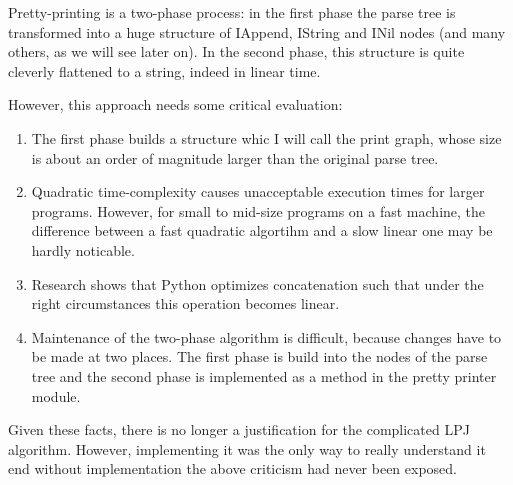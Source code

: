 \documentclass[11pt, a4paper]{article}
\begin{document}
Pretty-printing is a two-phase process: in the first phase the parse tree is transformed into a huge structure of IAppend, IString and INil nodes (and many others, as we will see later on).
In the second phase, this structure is quite cleverly flattened to a string, indeed in linear time.

However, this approach needs some critical evaluation:

\begin{enumerate}
\item The first phase builds a structure whic I will call the print graph, whose size is about an order of magnitude larger than the original parse tree.

\item Quadratic time-complexity causes unacceptable execution times for larger programs.
However, for small to mid-size programs on a fast machine, the difference between a fast quadratic algortihm and a slow linear one may be hardly noticable.

\item Research shows that Python optimizes concatenation such that under the right circumstances this operation becomes linear.

\item Maintenance of the two-phase algorithm is difficult, because changes have to be made at two places.
The first phase is build into the nodes of the parse tree and the second phase is implemented as a method in the pretty printer module.

\end{enumerate}

Given these facts, there is no longer a justification for the complicated LPJ algorithm.
However, implementing it was the only way to really understand it end without implementation the above criticism had never been exposed.
\end{document}
